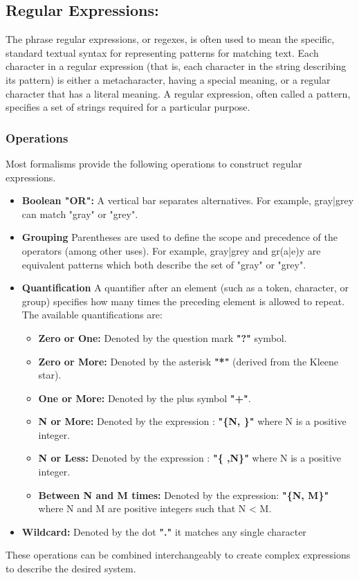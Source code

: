 \subsection{Regular Expressions:}
    The phrase regular expressions, or regexes, is often used to mean the specific, standard textual syntax for representing patterns for matching text. Each character in a regular expression (that is, each character in the string describing its pattern) is either a metacharacter, having a special meaning, or a regular character that has a literal meaning.
    A regular expression, often called a pattern, specifies a set of strings required for a particular purpose. 
\subsubsection{Operations}
Most formalisms provide the following operations to construct regular expressions. 
\begin{itemize}
    \item \textbf{Boolean "OR":} A vertical bar separates alternatives. For example, gray|grey can match "gray" or "grey".
    \item \textbf{Grouping} Parentheses are used to define the scope and precedence of the operators (among other uses). For example, gray|grey and gr(a|e)y are equivalent patterns which both describe the set of "gray" or "grey".
    \item \textbf{Quantification} A quantifier after an element (such as a token, character, or group) specifies how many times the preceding element is allowed to repeat.
    The available quantifications are:
    \begin{itemize}
        \item \textbf{Zero or One:} Denoted by the question mark \textbf{"?"} symbol.
        \item \textbf{Zero or More:} Denoted by the asterisk \textbf{"*"} (derived from the Kleene star). 
        \item \textbf{One or More:} Denoted by the plus symbol \textbf{"+"}.
        \item \textbf{N or More:} Denoted by the expression : \textbf{"\{N, \}"} where N is a positive integer.
        \item \textbf{N or Less:} Denoted by the expression : \textbf{"\{ ,N\}"} where N is a positive integer.
        \item \textbf{Between N and M times:} Denoted by the expression: \textbf{"\{N, M\}"} where N and M are positive integers such that N < M.
    \end{itemize}
    \item \textbf{Wildcard:} Denoted by the dot \textbf{"."} it matches any single character
\end{itemize}
These operations can be combined interchangeably to create complex expressions to describe the desired system.
